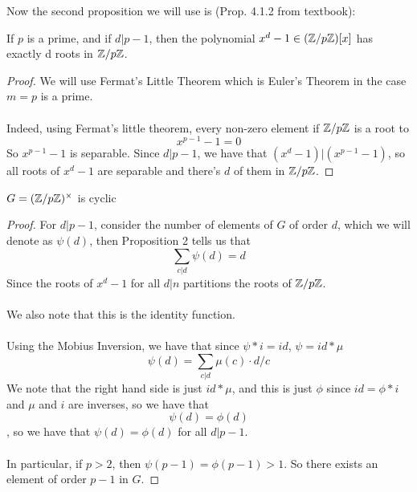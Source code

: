 Now the second proposition we will use is (Prop. 4.1.2 from textbook):

\begin{proposition}
If $p$ is a prime, and if $d | p - 1$, then the polynomial $x^d - 1 \in (\mathbb{Z}/p\mathbb{Z})[x]$ has exactly d roots in $\mathbb{Z}/p\mathbb{Z}$.
\end{proposition}

\begin{proof}
We will use Fermat's Little Theorem which is Euler's Theorem in the case $m = p$ is a prime.\\\\
Indeed, using Fermat's little theorem, every non-zero element if $\mathbb{Z}/p\mathbb{Z}$ is a root to
\[x^{p - 1} - 1 = 0\]
So $x^{p-1} - 1$ is separable. Since $d | p - 1$, we have that $(x^d - 1) | (x^{p-1} - 1)$, so all roots of $x^d - 1$ are separable and there's $d$ of them in $\mathbb{Z}/p\mathbb{Z}$.
\end{proof}

\begin{corollary}
$G = (\mathbb{Z}/p\mathbb{Z})^{\times}$ is cyclic
\end{corollary}

\begin{proof}
For $d | p - 1$, consider the number of elements of $G$ of order $d$, which we will denote as $\psi(d)$, then Proposition 2 tells us that
\[\sum_{c | d} \psi(d) = d\]
Since the roots of $x^d - 1$ for all $d | n$ partitions the roots of $\mathbb{Z}/p\mathbb{Z}$.\\\\
We also note that this is the identity function.\\\\
Using the Mobius Inversion, we have that since $\psi * i = id$, $\psi = id * \mu$
\[\psi(d) = \sum_{c | d} \mu(c) \cdot {d/c}\]
We note that the right hand side is just $id * \mu$, and this is just $\phi$ since $id = \phi * i$ and $\mu$ and $i$ are inverses, so we have that
\[\psi(d) = \phi(d)\]
, so we have that $\psi(d) = \phi(d)$ for all $d | p - 1$.\\\\
In particular, if $p > 2$, then $\psi(p - 1) = \phi(p - 1) > 1$. So there exists an element of order $p - 1$ in $G$.
\end{proof}